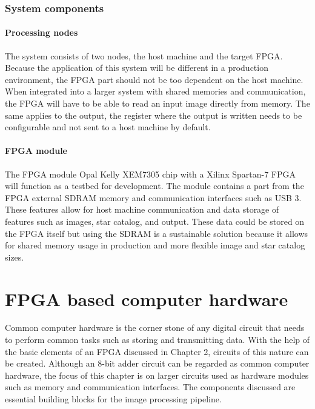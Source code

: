 \documentclass[12pt]{report}
\begin{document}
\subsection{System components}
\subsubsection{Processing nodes}
The system consists of two nodes, the host machine and the target FPGA. Because the application of this system will be different in a production environment, the FPGA part should not be too dependent on the host machine. When integrated into a larger system with shared memories and communication, the FPGA will have to be able to read an input image directly from memory. The same applies to the output, the register where the output is written needs to be configurable and not sent to a host machine by default.

\subsubsection{FPGA module}
The FPGA module Opal Kelly XEM7305 chip with a Xilinx Spartan-7 FPGA will function as a testbed for development. The module contains a part from the FPGA external SDRAM memory and communication interfaces such as USB 3. These features allow for host machine communication and data storage of features such as images, star catalog, and output. These data could be stored on the FPGA itself but using the SDRAM is a sustainable solution because it allows for shared memory usage in production and more flexible image and star catalog sizes.


\chapter{FPGA based computer hardware}
Common computer hardware is the corner stone of any digital circuit that needs to perform common tasks such as storing and transmitting data. With the help of the basic elements of an FPGA discussed in Chapter 2, circuits of this nature can be created. Although an 8-bit adder circuit can be regarded as common computer hardware, the focus of this chapter is on larger circuits used as hardware modules such as memory and communication interfaces. The components discussed are essential building blocks for the image processing pipeline.
\end{document}
